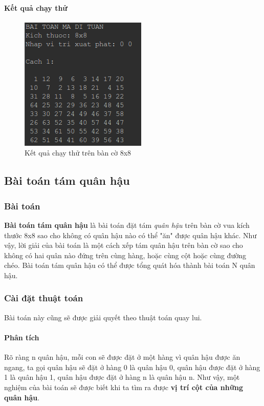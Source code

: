 \documentclass[8pt, a4paper]{article}
\begin{document}
\paragraph{Kết quả chạy thử}
\begin{figure}[htp]
\centering
\includegraphics[scale=0.50]{img/knight1.png}
\caption{Kết quả chạy thử trên bàn cờ 8x8}
\label{}
\end{figure}

\subsection{Bài toán tám quân hậu}

\subsubsection{Bài toán}
\textbf{Bài toán tám quân hậu} là bài toán đặt tám \emph{quân hậu} trên bàn cờ vua kích thước 8x8 sao cho không có quân hậu nào có thể "ăn" được quân hậu khác. Như vậy, lời giải của bài toán là một cách xếp tám quân hậu trên bàn cờ sao cho không có hai quân nào đứng trên cùng hàng, hoặc cùng cột hoặc cùng đường chéo. Bài toán tám quân hậu có thể được tổng quát hóa thành bài toán N quân hậu.

\subsubsection{Cài đặt thuật toán}
Bài toán này cũng sẽ được giải quyết theo thuật toán quay lui. 


\paragraph{Phân tích}
Rõ ràng n quân hậu, mỗi con sẽ được đặt ở một hàng vì quân hậu được ăn ngang, ta gọi quân hậu sẽ đặt ở hàng 0 là quân hậu 0, quân hậu được đặt ở hàng 1 là quân hậu 1, quân hậu được đặt ở hàng n là quân hậu n. Như vậy, một nghiệm của bài toán sẽ được biết khi ta tìm ra được \textbf{vị trí cột của những quân hậu}.
\end{document}
